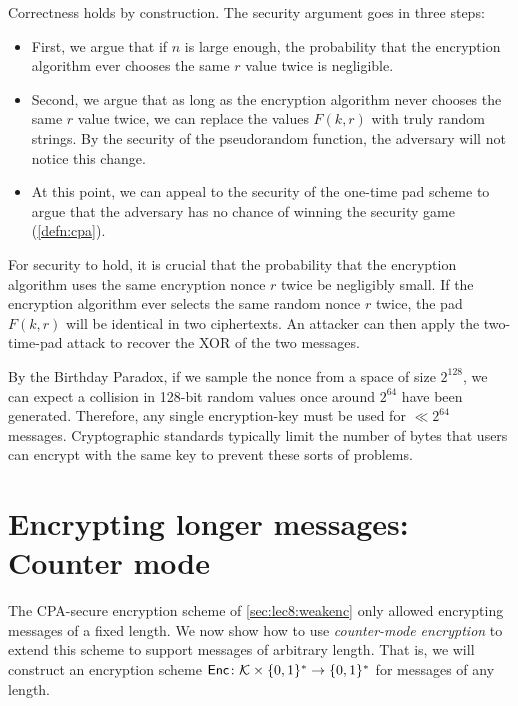 Correctness holds by construction.
The security argument goes in three steps:
\begin{itemize}
  \item First, we argue that if $n$ is large enough, the probability 
        that the encryption algorithm ever chooses the same $r$ value twice
        is negligible.
  \item Second, we argue that as long as the encryption algorithm
        never chooses the same $r$ value twice, 
        we can replace the values $F(k, r)$ with truly random strings.
        By the security of the pseudorandom function, the adversary will
        not notice this change.
  \item At this point, we can appeal to the security of the one-time pad scheme
        to argue that the adversary has no chance of winning the security 
        game (\cref{defn:cpa}).
\end{itemize}

For security to hold, it is crucial that the probability 
that the encryption algorithm uses the same encryption nonce $r$ twice
be negligibly small.
If the encryption algorithm ever selects the
same random nonce $r$ twice, the pad $F(k, r)$ will be identical in 
two ciphertexts.
An attacker can then apply the two-time-pad attack to recover the XOR of the two messages.

By the Birthday Paradox, if we sample the nonce from a space of size $2^{128}$, we can expect a collision in 128-bit random values once around $2^{64}$ have been generated. Therefore, any single encryption-key must be used for $\ll 2^{64}$ messages.
Cryptographic standards typically limit the number of bytes that users can
encrypt with the same key to prevent these sorts of problems.


\section{Encrypting longer messages: Counter mode}

The CPA-secure encryption scheme of \cref{sec:lec8:weakenc} only
allowed encrypting messages of a fixed length.
We now show how to use \emph{counter-mode encryption} to extend
this scheme to support messages of arbitrary length.
That is, we will construct an encryption scheme 
$\mathsf{Enc} \colon \mathcal{K} \times \{0,1\}^* \to \{0,1\}^*$
for messages of any length.

